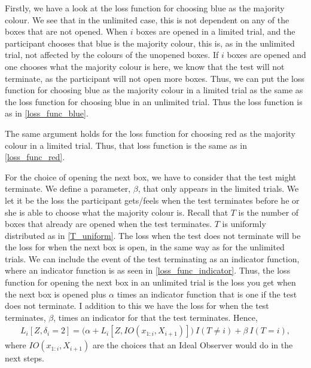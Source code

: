 Firstly, we have a look at the loss function for choosing blue as the majority colour. We see that in the unlimited case, this is not dependent on any of the boxes that are not opened. When $i$ boxes are opened in a limited trial, and the participant chooses that blue is the majority colour, this is, as in the unlimited trial, not affected by the colours of the unopened boxes. If $i$ boxes are opened and one chooses what the majority colour is here, we know that the test will not terminate, as the participant will not open more boxes. Thus, we can put the loss function for choosing blue as the majority colour in a limited trial as the same as the loss function for choosing blue in an unlimited trial. Thus the loss function is as in \eqref{loss_func_blue}.

The same argument holds for the loss function for choosing red as the majority colour in a limited trial. Thus, that loss function is the same as in \eqref{loss_func_red}.

For the choice of opening the next box, we have to consider that the test might terminate. 
We define a parameter, $\beta$, that only appears in the limited trials. 
We let it be the loss the participant gets/feels when the test terminates before he or she is able to choose what the majority colour is.
Recall that $T$ is the number of boxes that already are opened when the test terminates. 
$T$ is uniformly distributed as in \eqref{T_uniform}. The loss when the test does not terminate will be the loss for when the next box is open, in the same way as for the unlimited trials. We can include the event of the test terminating as an indicator function, where an indicator function is as seen in \eqref{loss_func_indicator}. Thus, the loss function for opening the next box in an unlimited trial is the loss you get when the next box is opened plus $\alpha$ times an indicator function that is one if the test does not terminate. I addition to this we have the loss for when the test terminates, $\beta$, times an indicator for that the test terminates. Hence,
\begin{equation}
\label{loss_func_2_limited}
    \begin{aligned}
        L_i[Z,\delta_i=2] = \big( \alpha + L_i[Z,IO(x_{1:i},X_{i+1})] \big) \: I(T\neq i) + \beta \: I(T=i),
    \end{aligned}
\end{equation}
where $IO(x_{1:i},X_{i+1})$ are the choices that an Ideal Observer would do in the next steps. 

